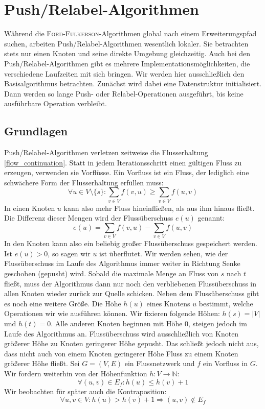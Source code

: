 \documentclass[12pt,a4paper,titlepage,onecolumn,ngerman,bibliography=totocnumbered]{scrartcl}
\theoremstyle{definition}
\theoremstyle{remark}
\newcommand{\ff}{\textsc{Ford-Fulkerson}}
\newcommand{\pr}{Push/Relabel}
\begin{document}
\section{\pr -Algorithmen}
Während die \ff -Algorithmen global nach einem Erweiterungspfad suchen, arbeiten \pr -Algorithmen wesentlich lokaler.
Sie betrachten stets nur einen Knoten und seine direkte Umgebung gleichzeitig.
Auch bei den \pr -Algorithmen gibt es mehrere Implementationsmöglichkeiten, die verschiedene Laufzeiten mit sich bringen.
Wir werden hier ausschließlich den Basisalgorithmus betrachten.
Zunächst wird dabei eine Datenstruktur initialisiert. 
Dann werden so lange Push- oder Relabel-Operationen ausgeführt, bis keine ausführbare Operation verbleibt.

\subsection{Grundlagen}
\pr -Algorithmen verletzen zeitweise die Flusserhaltung \eqref{flow_continuation}.
Statt in jedem Iterationsschritt einen gültigen Fluss zu erzeugen, verwenden sie Vorflüsse.
Ein Vorfluss ist ein Fluss, der lediglich eine schwächere Form der Flusserhaltung erfüllen muss:
\begin{equation}\label{eq:preflow}
    \forall u\in V\setminus\{s\}:\sum_{v\in V}f(v,u)\geq\sum_{v\in V}f(u,v)
\end{equation}
In einen Knoten $u$ kann also mehr Fluss hineinfließen, als aus ihm hinaus fließt.
Die Differenz dieser Mengen wird der Flussüberschuss $e(u)$ genannt:
\begin{equation}\label{eq:flow_excess}
    e(u) = \sum_{v\in V}f(v,u) -\sum_{v\in V}f(u,v)
\end{equation}
In den Knoten kann also ein beliebig großer Flussüberschuss gespeichert werden.
Ist $e(u)>0$, so sagen wir $u$ ist überflutet.
Wir werden sehen, wie der Flussüberschuss im Laufe des Algorithmus immer weiter in Richtung Senke geschoben (gepusht) wird.
Sobald die maximale Menge an Fluss von $s$ nach $t$ fließt, muss der Algorithmus dann nur noch den verbliebenen Flussüberschuss in allen Knoten wieder zurück zur Quelle schicken.
\medbreak
Neben dem Flussüberschuss gibt es noch eine weitere Größe.
Die Höhe $h(u)$ eines Knotens $u$ bestimmt, welche Operationen wir wie ausführen können.
Wir fixieren folgende Höhen: $h(s) = \lvert V\rvert$ und $h(t) = 0$.
Alle anderen Knoten beginnen mit Höhe $0$, steigen jedoch im Laufe des Algorithmus an.
Flussüberschuss wird ausschließlich von Knoten größerer Höhe zu Knoten geringerer Höhe gepusht.
Das schließt jedoch nicht aus, dass nicht auch von einem Knoten geringerer Höhe Fluss zu einem Knoten größerer Höhe fließt.
Sei $G=(V,E)$ ein Flussnetzwerk und $f$ ein Vorfluss in $G$.
Wir fordern weiterhin von der Höhenfunktion $h:V\to\mathbb{N}$:
\begin{equation}\label{eq:height_function}
    \forall (u,v)\in E_f: h(u)\leq h(v) + 1
\end{equation}
Wir beobachten für später auch die Kontraposition:
\begin{equation}\label{eq:contraposition_height}
    \forall u,v\in V: h(u) > h(v) + 1\Rightarrow (u,v) \not\in E_f
\end{equation}
\end{document}
